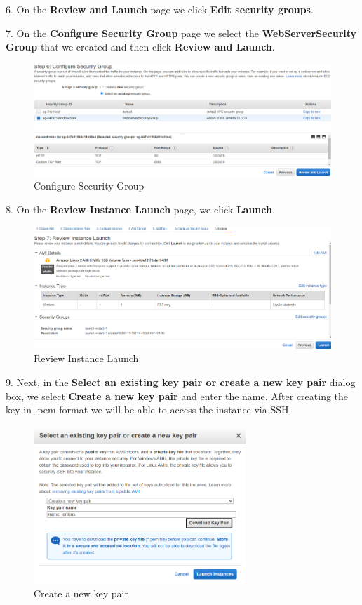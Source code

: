 \documentclass[12pt,a4paper,twoside]{article}
\begin{document}
6. On the \textbf{Review and Launch} page we click \textbf{Edit security groups}.


7. On the \textbf{Configure Security Group} page we select the \textbf{WebServerSecurity Group} that we created and then click \textbf{Review and Launch}.


\begin{figure}[H]
    \centering
        \includegraphics[width=15cm]{images-aws/8-config-sec-group.png}
        \caption{Configure Security Group}
\end{figure}


8. On the \textbf{Review Instance Launch} page, we click \textbf{Launch}.


\begin{figure}[H]
    \centering
        \includegraphics[width=15cm]{images-aws/9-review-instance-launch.png}
        \caption{Review Instance Launch}
\end{figure}


9. Next, in the \textbf{Select an existing key pair or create a new key pair} dialog box, we select \textbf{Create a new key pair} and enter the name. After creating the key in .pem format we will be able to access the instance via SSH.


\begin{figure}[H]
    \centering
        \includegraphics[width=8cm]{images-aws/10-key-pair.png}
        \caption{Create a new key pair}
\end{figure}
\end{document}
